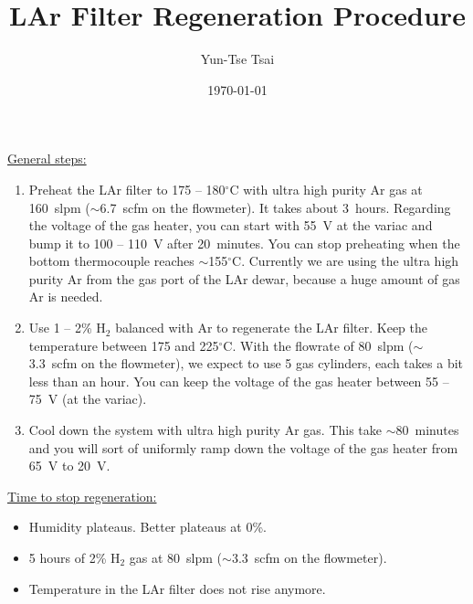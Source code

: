 \documentclass[letterpaper,11pt]{article}
\newcommand{\Hydro}     {H$_2$}
\newcommand{\dC}        {$^\circ$C}
\begin{document}
\title{\textbf{LAr Filter Regeneration Procedure}}
\author{Yun-Tse Tsai}
\date{\today}

\maketitle

\underline{General steps:}
\begin{enumerate}
\setlength\itemsep{-0.2em}
\item Preheat the LAr filter to 175 -- 180{\dC} with ultra high purity Ar gas at 160~slpm ($\sim$6.7~scfm on the flowmeter).  
It takes about 3~hours.  Regarding the voltage of the gas heater, you can start with 55~V at the variac and bump it 
to 100 -- 110~V after 20~minutes.  
You can stop preheating when the bottom thermocouple reaches $\sim$155{\dC}.
Currently we are using the ultra high purity Ar from the gas port of the LAr dewar, because a huge amount of gas Ar
is needed.
\item Use 1 -- 2\% {\Hydro} balanced with Ar to regenerate the LAr filter.  Keep the temperature between 175 and 225{\dC}.  
With the flowrate of 80~slpm ($\sim$3.3~scfm on the flowmeter), we expect to use 5 gas cylinders, 
each takes a bit less than an hour.  You can keep the voltage of the gas heater between 55 -- 75~V (at the variac).
\item Cool down the system with ultra high purity Ar gas.  
This take $\sim$80~minutes and you will sort of uniformly ramp down the voltage of the gas heater from 65~V to 20~V.
\end{enumerate}

\underline{Time to stop regeneration:}
\begin{itemize}
\setlength\itemsep{-0.2em}
\item Humidity plateaus.  Better plateaus at {\color{orange}0\%}.
\item 5 hours of 2\% {\Hydro} gas at 80~slpm ($\sim$3.3~scfm on the flowmeter).
\item Temperature in the LAr filter does not rise anymore.
\end{itemize}
\end{document}
